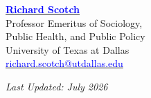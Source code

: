 \documentclass[11pt, letterpaper]{article}
\begin{document}
\vspace{1.5em}

\begin{minipage}[t]{0.48\textwidth}
    \raggedright
    \textbf{\href{https://profiles.utdallas.edu/richard.scotch}{\textcolor{blue}{Richard Scotch}}} \\
    Professor Emeritus of Sociology, \\
    Public Health, and Public Policy \\
    University of Texas at Dallas \\
    \href{mailto:richard.scotch@utdallas.edu}{\textcolor{blue}{richard.scotch@utdallas.edu}}
\end{minipage}

\vspace{1em}
\begin{center}
    \textit{Last Updated: July 2026}
\end{center}
\end{document}
